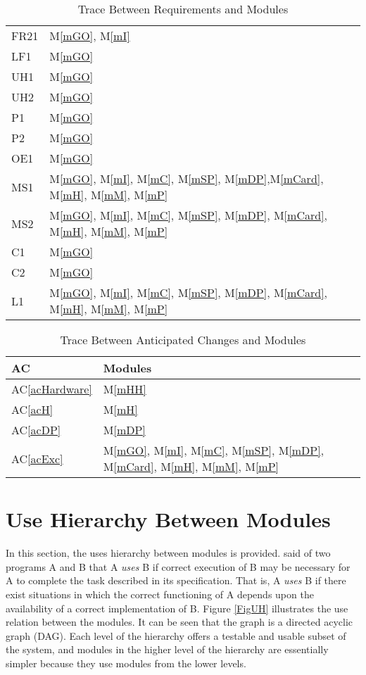 \documentclass[12pt, titlepage]{article}
\newcommand{\acref}[1]{AC\ref{#1}}
\newcommand{\mref}[1]{M\ref{#1}}
\begin{document}
\begin{table}[H]
\begin{tabular}{p{} p{}}
        FR21 & \mref{mGO}, \mref{mI} \\
        LF1 & \mref{mGO} \\
        UH1 & \mref{mGO} \\
        UH2 & \mref{mGO} \\
        P1 & \mref{mGO} \\
        P2 & \mref{mGO} \\
        OE1 & \mref{mGO} \\
        MS1 & \mref{mGO}, \mref{mI}, \mref{mC}, \mref{mSP}, \mref{mDP},\mref{mCard}, \mref{mH}, \mref{mM}, \mref{mP} \\
        MS2 & \mref{mGO}, \mref{mI}, \mref{mC}, \mref{mSP}, \mref{mDP}, \mref{mCard}, \mref{mH}, \mref{mM}, \mref{mP} \\
        C1 & \mref{mGO} \\
        C2 & \mref{mGO} \\
        L1 & \mref{mGO}, \mref{mI}, \mref{mC}, \mref{mSP}, \mref{mDP}, \mref{mCard}, \mref{mH}, \mref{mM}, \mref{mP} \\
        \bottomrule
    \end{tabular}
    \caption{Trace Between Requirements and Modules}
    \label{TblRT}
\end{table}

\begin{table}[H]
\centering
\begin{tabular}{p{} p{}}
\toprule
\textbf{AC} & \textbf{Modules}\\
\midrule
\acref{acHardware} & \mref{mHH}\\
\acref{acH} & \mref{mH}\\
\acref{acDP} & \mref{mDP}\\
\acref{acExc} & \mref{mGO}, \mref{mI}, \mref{mC}, \mref{mSP}, \mref{mDP}, \mref{mCard}, \mref{mH}, \mref{mM}, \mref{mP}\\
\bottomrule
\end{tabular}
\caption{Trace Between Anticipated Changes and Modules}
\label{TblACT}
\end{table}

\section{Use Hierarchy Between Modules} \label{SecUse}

In this section, the uses hierarchy between modules is
provided. \citet{Parnas1978} said of two programs A and B that A {\em uses} B if
correct execution of B may be necessary for A to complete the task described in
its specification. That is, A {\em uses} B if there exist situations in which
the correct functioning of A depends upon the availability of a correct
implementation of B. Figure \ref{FigUH} illustrates the use relation between
the modules. It can be seen that the graph is a directed acyclic graph
(DAG). Each level of the hierarchy offers a testable and usable subset of the
system, and modules in the higher level of the hierarchy are essentially simpler
because they use modules from the lower levels.
\end{document}
